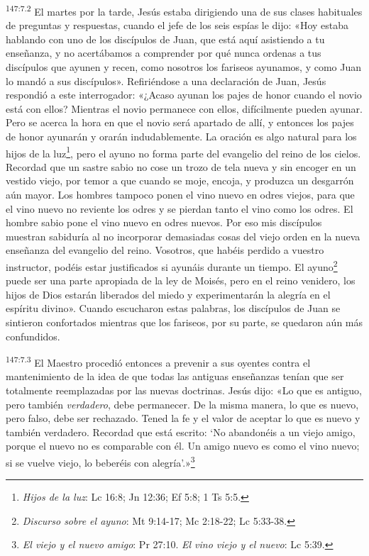 \par
\textsuperscript{147:7.2} El martes por la tarde, Jesús estaba dirigiendo una de sus clases habituales de preguntas y respuestas, cuando el jefe de los seis espías le dijo: «Hoy estaba hablando con uno de los discípulos de Juan, que está aquí asistiendo a tu enseñanza, y no acertábamos a comprender por qué nunca ordenas a tus discípulos que ayunen y recen, como nosotros los fariseos ayunamos, y como Juan lo mandó a sus discípulos». Refiriéndose a una declaración de Juan, Jesús respondió a este interrogador: «¿Acaso ayunan los pajes de honor cuando el novio está con ellos? Mientras el novio permanece con ellos, difícilmente pueden ayunar. Pero se acerca la hora en que el novio será apartado de allí, y entonces los pajes de honor ayunarán y orarán indudablemente. La oración es algo natural para los hijos de la luz\footnote{\textit{Hijos de la luz}: Lc 16:8; Jn 12:36; Ef 5:8; 1 Ts 5:5.}, pero el ayuno no forma parte del evangelio del reino de los cielos. Recordad que un sastre sabio no cose un trozo de tela nueva y sin encoger en un vestido viejo, por temor a que cuando se moje, encoja, y produzca un desgarrón aún mayor. Los hombres tampoco ponen el vino nuevo en odres viejos, para que el vino nuevo no reviente los odres y se pierdan tanto el vino como los odres. El hombre sabio pone el vino nuevo en odres nuevos. Por eso mis discípulos muestran sabiduría al no incorporar demasiadas cosas del viejo orden en la nueva enseñanza del evangelio del reino. Vosotros, que habéis perdido a vuestro instructor, podéis estar justificados si ayunáis durante un tiempo. El ayuno\footnote{\textit{Discurso sobre el ayuno}: Mt 9:14-17; Mc 2:18-22; Lc 5:33-38.} puede ser una parte apropiada de la ley de Moisés, pero en el reino venidero, los hijos de Dios estarán liberados del miedo y experimentarán la alegría en el espíritu divino». Cuando escucharon estas palabras, los discípulos de Juan se sintieron confortados mientras que los fariseos, por su parte, se quedaron aún más confundidos.

\par
\textsuperscript{147:7.3} El Maestro procedió entonces a prevenir a sus oyentes contra el mantenimiento de la idea de que todas las antiguas enseñanzas tenían que ser totalmente reemplazadas por las nuevas doctrinas. Jesús dijo: «Lo que es antiguo, pero también \textit{verdadero}, debe permanecer. De la misma manera, lo que es nuevo, pero falso, debe ser rechazado. Tened la fe y el valor de aceptar lo que es nuevo y también verdadero. Recordad que está escrito: `No abandonéis a un viejo amigo, porque el nuevo no es comparable con él. Un amigo nuevo es como el vino nuevo; si se vuelve viejo, lo beberéis con alegría'.»\footnote{\textit{El viejo y el nuevo amigo}: Pr 27:10. \textit{El vino viejo y el nuevo}: Lc 5:39.}

